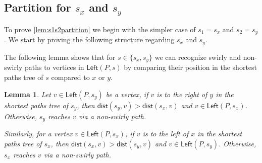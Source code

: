 \documentclass{article}
\newcommand{\Left}{\mathsf{Left}}
\newcommand{\dist}{\mathsf{dist}}
\newtheorem{lemma}{Lemma}
\begin{document}
\subsection{Partition for $s_x$ and $s_y$}\label{sec:xy-partition}


To prove \cref{lem:s1s2partition} we begin with the simpler case of  $s_1=s_x$ and $s_2=s_y$.
We start by proving the following structure regarding $s_x$ and $s_y$.

The following lemma shows that for $s\in\{s_x,s_y\}$ we can recognize swirly and non-swirly paths to vertices in $\Left(P,s)$ by comparing their position in the shortest paths tree of $s$ compared to $x$ or $y$.
\begin{lemma}\label{lem:rightloseleftswirl}
    Let $v \in \Left(P,s_y)$ be a vertex,
    if $v$ is to the right of $y$ in the shortest paths tree of $s_y$, then $\dist(s_y,v) > \dist(s_x,v)$ and $v\in \Left(P,s_x)$.
    Otherwise, $s_y$ reaches $v$ via a non-swirly path.

    Similarly, for a vertex $v\in\Left(P,s_x)$, if $v$ is to the left of $x$ in the shortest paths tree of $s_x$, then $\dist(s_x,v) > \dist(s_y,v)$ and $v\in \Left(P,s_y)$.
    Otherwise, $s_x$ reaches $v$ via a non-swirly path.
\end{lemma}
\end{document}

